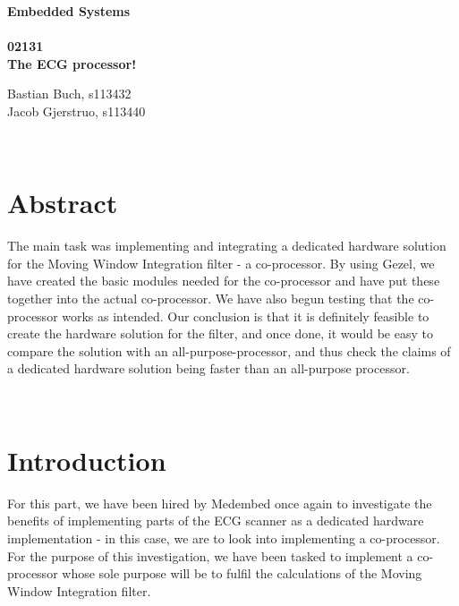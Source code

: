 \documentclass[12pt,a4paper]{article}
\begin{document}
\begin{titlepage}
	\begin{center}
		\vspace*{13\baselineskip}
		\huge
		\bfseries
		Embedded Systems\\ 
		\ \\
		02131 \\[5\baselineskip]

		\normalfont
		\Large
		The ECG processor!\\	

		\small
		\vfill
	\end{center}	
	\begin{flushleft}
		Bastian Buch, s113432\\
	 	Jacob Gjerstruo, s113440\\
	\end{flushleft}
\end{titlepage}

\ \\
\section*{Abstract}
	The main task was implementing and integrating a dedicated hardware solution for the Moving Window Integration filter - a co-processor. By using Gezel, we have created the basic modules needed for the co-processor and have put these together into the actual co-processor. We have also begun testing that the co-processor works as intended. Our conclusion is that it is definitely feasible to create the hardware solution for the filter, and once done, it would be easy to compare the solution with an all-purpose-processor, and thus check the claims of a dedicated hardware solution being faster than an all-purpose processor.
\thispagestyle{empty} 
\newpage

\tableofcontents
\thispagestyle{empty} 
\newpage

\setcounter{page}{1}

\ \\
\section{Introduction}
For this part, we have been hired by Medembed once again to investigate the benefits of implementing parts of the ECG scanner as a dedicated hardware implementation - in this case, we are to look into implementing a co-processor. For the purpose of this investigation, we have been tasked to implement a co-processor whose sole purpose will be to fulfil the calculations of the Moving Window Integration filter.
\end{document}
